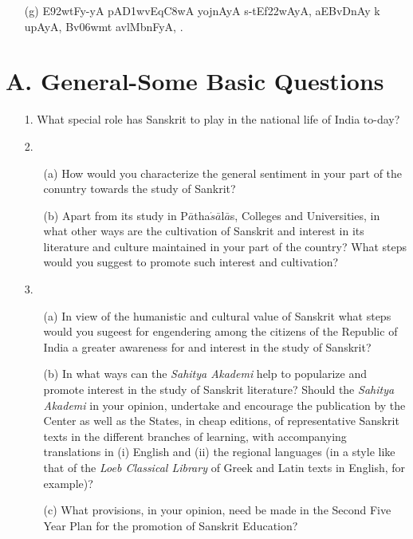 \begin{itemize}
\begin{itemize}
                      \item[({\dn g})] {\dn E\392wtFy-yA\2 pA\3D1wvEq\0\3C8wA\2 yojnAyA\2 s\2-tEf\322wAyA, aEBvD\0nAy k\? upAyA, Bv\306wmt\? avlMbnFyA, .}
                      \end{itemize} 
\end{itemize}

{\rm 
\section*{{\rm\bfseries A. General-Some Basic Questions}}

\noindent
\begin{itemize}
  
  \item[1.] What special role has Sanskrit to play in the national life of India to-day?
  
  \item[2.] \begin{itemize}
            \item[(a)] How would you characterize the general sentiment in your part of the conuntry towards the study of Sankrit?  
              
              \item[(b)] Apart from its study in P$\bar{a}$tha$\acute{s}\bar{a}$l$\bar{a}$s, Colleges and Universities, in what other ways are the cultivation of Sanskrit and interest in its literature and culture maintained in your part of the country? What steps would you suggest to promote such interest and cultivation?
             \end{itemize}
  \item[3.]\begin{itemize}
           \item[(a)] In view of the humanistic and cultural value of Sanskrit what steps would you sugeest for engendering among the citizens of the Republic of India a greater awareness for and interest in the study of Sanskrit?
           
           \item[(b)] In what ways can the {\textit {Sahitya Akademi}} help to popularize and promote interest in the study of Sanskrit literature? Should the {\textit {Sahitya Akademi}} in your opinion, undertake and encourage the publication by the Center as well as the States, in cheap editions, of representative Sanskrit texts in the different branches of learning, with accompanying translations in (i) English and (ii) the regional languages (in a style like that of the {\textit {Loeb Classical Library}} of Greek and Latin texts in English, for example)?
           
           \item[(c)] What provisions, in your opinion, need be made in the Second Five Year Plan for the promotion of Sanskrit Education?
           \end{itemize}
\end{itemize}           
}

